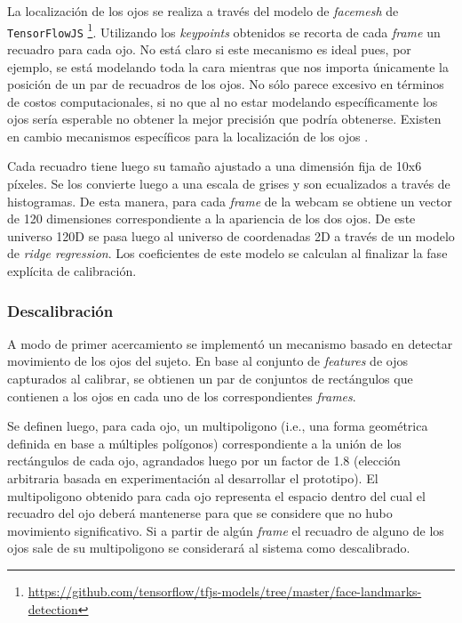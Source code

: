 La localización de los ojos se realiza a través del modelo de \textit{facemesh}
de \texttt{TensorFlowJS}
\footnote{\url{https://github.com/tensorflow/tfjs-models/tree/master/face-landmarks-detection}}.
Utilizando los \textit{keypoints} obtenidos se recorta de cada \textit{frame}
un recuadro para cada ojo.
No está claro si este mecanismo es ideal pues, por ejemplo, se está modelando
toda la cara mientras que nos importa únicamente la posición de un par de
recuadros de los ojos.
No sólo parece excesivo en términos de costos computacionales, si no que al no
estar modelando específicamente los ojos sería esperable no obtener la mejor
precisión que podría obtenerse.
Existen en cambio mecanismos específicos para la localización de los ojos
\cite{hansen_2009_eye_of_the_beholder}.

Cada recuadro tiene luego su tamaño ajustado a una dimensión fija de 10x6
píxeles.
Se los convierte luego a una escala de grises y son ecualizados a través de
histogramas.
De esta manera, para cada \textit{frame} de la webcam se obtiene un vector de
120 dimensiones correspondiente a la apariencia de los dos ojos.
De este universo 120D se pasa luego al universo de coordenadas 2D a través de
un modelo de \textit{ridge regression}.
Los coeficientes de este modelo se calculan al finalizar la fase explícita de
calibración.

\subsubsection{Descalibración}

A modo de primer acercamiento se implementó un mecanismo basado en detectar
movimiento de los ojos del sujeto.
En base al conjunto de \textit{features} de ojos capturados al calibrar, se
obtienen un par de conjuntos de rectángulos que contienen a los ojos en cada
uno de los correspondientes \textit{frames}.

Se definen luego, para cada ojo, un multipoligono (i.e., una forma geométrica
definida en base a múltiples polígonos) correspondiente a la unión de los
rectángulos de cada ojo, agrandados luego por un factor de 1.8 (elección
arbitraria basada en experimentación al desarrollar el prototipo).
El multipoligono obtenido para cada ojo representa el espacio dentro del cual
el recuadro del ojo deberá mantenerse para que se considere que no hubo
movimiento significativo.
Si a partir de algún \textit{frame} el recuadro de alguno de los ojos sale de
su multipoligono se considerará al sistema como descalibrado.

